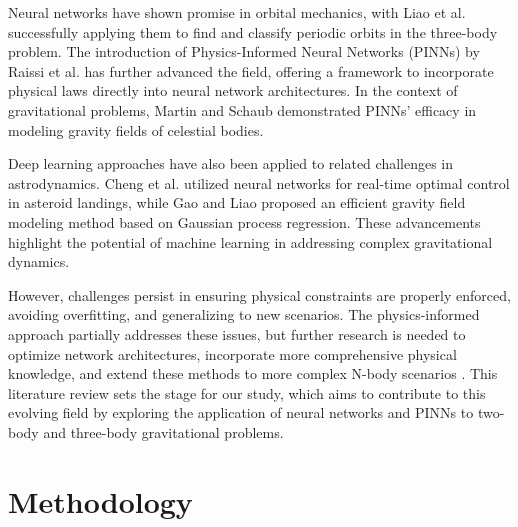 \documentclass[11pt,a4paper, twocolumn]{article}
\begin{document}
Neural networks have shown promise in orbital mechanics, with Liao et al. \cite{liao2020} successfully applying them to find and classify periodic orbits in the three-body problem. The introduction of Physics-Informed Neural Networks (PINNs) by Raissi et al. \cite{raissi2019} has further advanced the field, offering a framework to incorporate physical laws directly into neural network architectures. In the context of gravitational problems, Martin and Schaub \cite{martin2022} demonstrated PINNs' efficacy in modeling gravity fields of celestial bodies.

Deep learning approaches have also been applied to related challenges in astrodynamics. Cheng et al. \cite{cheng2020} utilized neural networks for real-time optimal control in asteroid landings, while Gao and Liao \cite{gao2019} proposed an efficient gravity field modeling method based on Gaussian process regression. These advancements highlight the potential of machine learning in addressing complex gravitational dynamics.

However, challenges persist in ensuring physical constraints are properly enforced, avoiding overfitting, and generalizing to new scenarios. The physics-informed approach partially addresses these issues, but further research is needed to optimize network architectures, incorporate more comprehensive physical knowledge, and extend these methods to more complex N-body scenarios \cite{meng2022physics}. This literature review sets the stage for our study, which aims to contribute to this evolving field by exploring the application of neural networks and PINNs to two-body and three-body gravitational problems.
\section{Methodology}
\label{sec:methodology}
\end{document}
